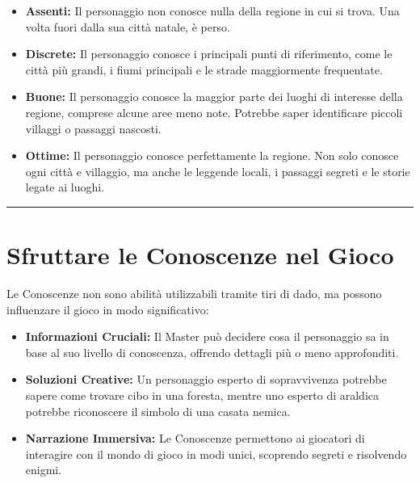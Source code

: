 \documentclass[../manuale_main.tex]{subfiles}
\begin{document}
\begin{itemize}
    \item \textbf{Assenti:} Il personaggio non conosce nulla della regione in cui si trova. Una volta fuori dalla sua città natale, è perso.
    
    \item \textbf{Discrete:} Il personaggio conosce i principali punti di riferimento, come le città più grandi, i fiumi principali e le strade maggiormente frequentate.
    
    \item \textbf{Buone:} Il personaggio conosce la maggior parte dei luoghi di interesse della regione, comprese alcune aree meno note. Potrebbe saper identificare piccoli villaggi o passaggi nascosti.
    
    \item \textbf{Ottime:} Il personaggio conosce perfettamente la regione. Non solo conosce ogni città e villaggio, ma anche le leggende locali, i passaggi segreti e le storie legate ai luoghi.
\end{itemize}

\vspace{0.5cm}
\noindent
\begin{center}
\rule{\textwidth}{0.4pt} 
\end{center}
\vspace{0.5cm}

\section*{Sfruttare le Conoscenze nel Gioco}
Le Conoscenze non sono abilità utilizzabili tramite tiri di dado, ma possono influenzare il gioco in modo significativo:

\begin{itemize}
    \item \textbf{Informazioni Cruciali:} Il Master può decidere cosa il personaggio sa in base al suo livello di conoscenza, offrendo dettagli più o meno approfonditi.
    
    \item \textbf{Soluzioni Creative:} Un personaggio esperto di sopravvivenza potrebbe sapere come trovare cibo in una foresta, mentre uno esperto di araldica potrebbe riconoscere il simbolo di una casata nemica.
    
    \item \textbf{Narrazione Immersiva:} Le Conoscenze permettono ai giocatori di interagire con il mondo di gioco in modi unici, scoprendo segreti e risolvendo enigmi.
\end{itemize}
\end{document}
